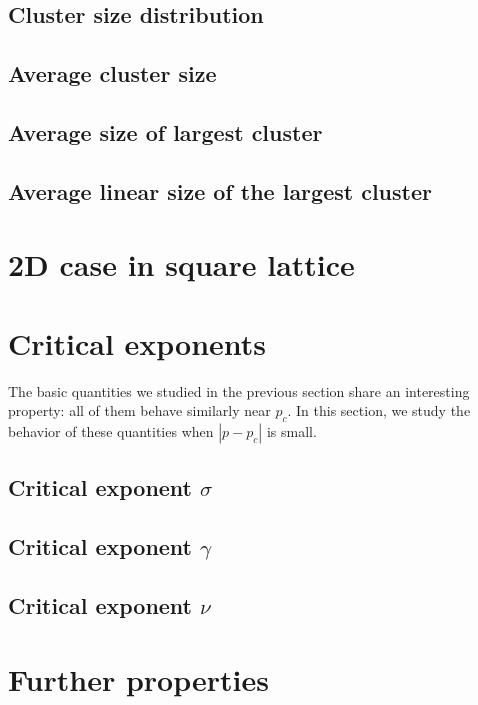 \subsection{Cluster size distribution}

\subsection{Average cluster size}

\subsection{Average size of largest cluster}

\subsection{Average linear size of the largest cluster}



\section{2D case in square lattice}\label{sec:2dsquare}


\section{Critical exponents}

The basic quantities we studied in the previous section share an interesting property: all of them behave similarly near $p_c$. In this section, we study the behavior of these quantities when $|p - p_c|$ is small.

\subsection{Critical exponent $\sigma$}

\subsection{Critical exponent $\gamma$}

\subsection{Critical exponent $\nu$}


\section{Further properties}


